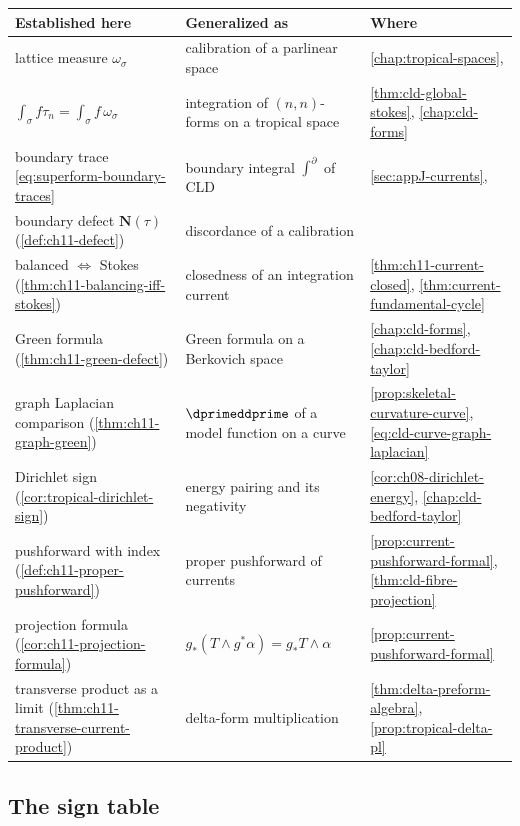 \begin{center}
\small
\begin{tabular}{p{}|p{}|p{}}
\textbf{Established here}&\textbf{Generalized as}&\textbf{Where}\\ \hline
lattice measure $\omega_\sigma$
  &calibration of a parlinear space
  &\cref{chap:tropical-spaces},
   \cite[\S4.6]{CLD25}\\
$\int_\sigma f\tau_n=\int_\sigma f\,\omega_\sigma$
  &integration of $(n,n)$-forms on a tropical space
  &\cref{thm:cld-global-stokes},
   \cref{chap:cld-forms}\\
boundary trace
   \eqref{eq:superform-boundary-traces}
  &boundary integral $\int^\partial$ of CLD
  &\cref{sec:appJ-currents},
   \cite[\S5.9]{CLD25}\\
boundary defect $\mathbf N(\tau)$
   (\cref{def:ch11-defect})
  &discordance of a calibration
  &\cite[\S4.6.7]{CLD25}\\
balanced $\Leftrightarrow$ Stokes
   (\cref{thm:ch11-balancing-iff-stokes})
  &closedness of an integration current
  &\cref{thm:ch11-current-closed},
   \cref{thm:current-fundamental-cycle}\\
Green formula
   (\cref{thm:ch11-green-defect})
  &Green formula on a Berkovich space
  &\cref{chap:cld-forms},
   \cref{chap:cld-bedford-taylor}\\
graph Laplacian comparison
   (\cref{thm:ch11-graph-green})
  &$\dprimeddprime$ of a model function on a curve
  &\cref{prop:skeletal-curvature-curve},
   \eqref{eq:cld-curve-graph-laplacian}\\
Dirichlet sign
   (\cref{cor:tropical-dirichlet-sign})
  &energy pairing and its negativity
  &\cref{cor:ch08-dirichlet-energy},
   \cref{chap:cld-bedford-taylor}\\
pushforward with index
   (\cref{def:ch11-proper-pushforward})
  &proper pushforward of currents
  &\cref{prop:current-pushforward-formal},
   \cref{thm:cld-fibre-projection}\\
projection formula
   (\cref{cor:ch11-projection-formula})
  &$g_*(T\wedge g^*\alpha)=g_*T\wedge\alpha$
  &\cref{prop:current-pushforward-formal}\\
transverse product as a limit
   (\cref{thm:ch11-transverse-current-product})
  &delta-form multiplication
  &\cref{thm:delta-preform-algebra},
   \cref{prop:tropical-delta-pl}
\end{tabular}
\end{center}

\subsection{The sign table}
\label{sec:ch11-sign-table}

